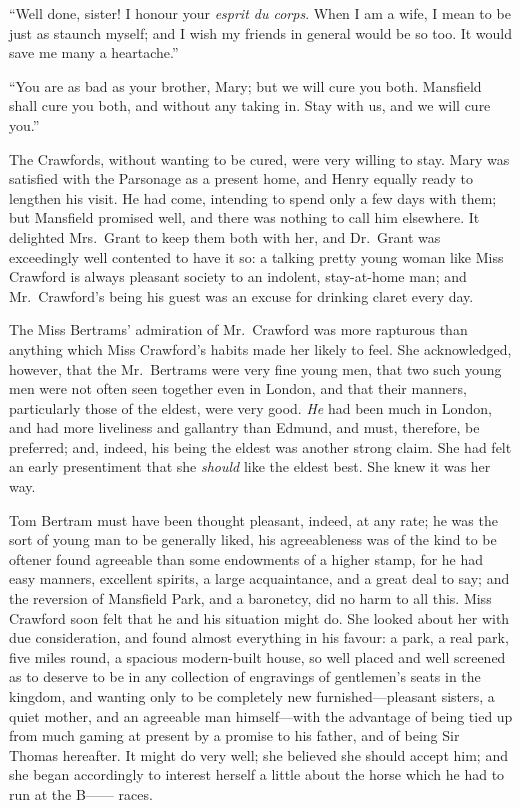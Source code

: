 \documentclass{article}
\newcommand{\gdash}{{---}{---}}
\begin{document}
``Well done, sister!  I honour your \emph{esprit du corps}.
When I am a wife, I mean to be just as staunch myself;
and I wish my friends in general would be so too.  It would
save me many a heartache.''

``You are as bad as your brother, Mary; but we will cure
you both.  Mansfield shall cure you both, and without
any taking in.  Stay with us, and we will cure you.''

The Crawfords, without wanting to be cured, were very
willing to stay.  Mary was satisfied with the Parsonage
as a present home, and Henry equally ready to lengthen
his visit.  He had come, intending to spend only a few
days with them; but Mansfield promised well, and there
was nothing to call him elsewhere.  It delighted Mrs.\ Grant
to keep them both with her, and Dr.\ Grant was exceedingly
well contented to have it so:  a talking pretty young
woman like Miss Crawford is always pleasant society
to an indolent, stay-at-home man; and Mr.\ Crawford's
being his guest was an excuse for drinking claret every day.

The Miss Bertrams' admiration of Mr.\ Crawford was more
rapturous than anything which Miss Crawford's habits made
her likely to feel.  She acknowledged, however, that the
Mr.\ Bertrams were very fine young men, that two such
young men were not often seen together even in London,
and that their manners, particularly those of the eldest,
were very good.  \emph{He} had been much in London,
and had more liveliness and gallantry than Edmund,
and must, therefore, be preferred; and, indeed, his being
the eldest was another strong claim.  She had felt an early
presentiment that she \emph{should} like the eldest best.
She knew it was her way.

Tom Bertram must have been thought pleasant, indeed, at any rate;
he was the sort of young man to be generally liked,
his agreeableness was of the kind to be oftener found
agreeable than some endowments of a higher stamp, for he
had easy manners, excellent spirits, a large acquaintance,
and a great deal to say; and the reversion of Mansfield Park,
and a baronetcy, did no harm to all this.  Miss Crawford
soon felt that he and his situation might do.  She looked
about her with due consideration, and found almost everything
in his favour:  a park, a real park, five miles round,
a spacious modern-built house, so well placed and well
screened as to deserve to be in any collection of engravings
of gentlemen's seats in the kingdom, and wanting only to be
completely new furnished---pleasant sisters, a quiet mother,
and an agreeable man himself---with the advantage of
being tied up from much gaming at present by a promise
to his father, and of being Sir Thomas hereafter.
It might do very well; she believed she should accept him;
and she began accordingly to interest herself a little
about the horse which he had to run at the B\gdash{} races.
\end{document}
